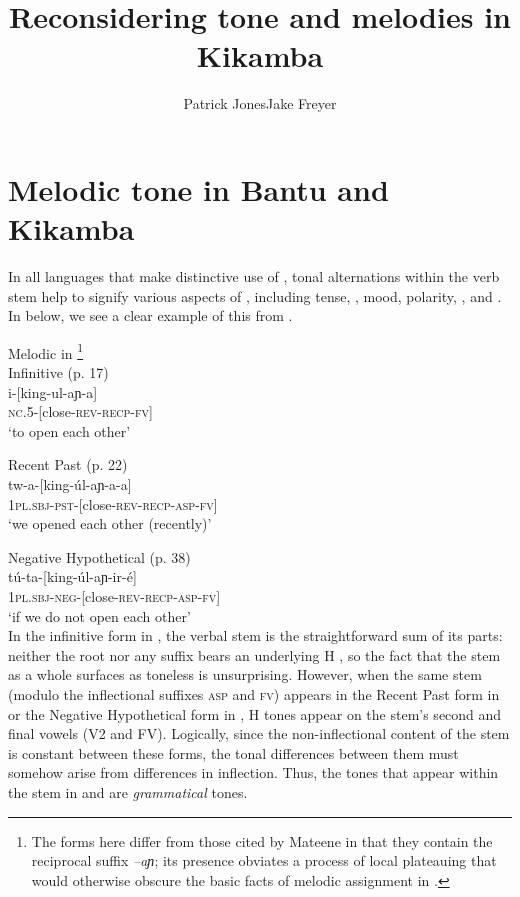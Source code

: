 \documentclass[output=paper,newtxmath,modfonts,nonflat,hidelinks]{langsci/langscibook}
\title{Reconsidering tone and melodies in Kikamba}
\author{Patrick Jones\affiliation{University of South Florida}\lastand Jake Freyer\affiliation{Brandeis University}}
\begin{document}
\maketitle

\section{Melodic tone in Bantu and Kikamba}\label{sec:jones:1}

In all  languages that make distinctive use of , tonal alternations within the verb stem help to signify various aspects of , including tense, , mood, polarity, , and  \citep{Bickmore2014}. In  below, we see a clear example of this from  \citep{Mateene1992}.


\ea\label{ex:jones:1}
Melodic  in  \citep{Mateene1992}\footnote{The forms here differ from those cited by Mateene in that they contain the reciprocal suffix \textit{–aɲ}; its presence obviates a process of local  plateauing that would otherwise obscure the basic facts of melodic  assignment in .}\\
\ea\label{ex:jones:1a}
Infinitive (p. 17)\\
\gll   i-[king-ul-aɲ-a]\\
       \textsc{nc}.5-[close-\textsc{rev}-\textsc{recp}-\textsc{fv}]\footnotemark\\
\glt   ‘to open each other’  


\ex\label{ex:jones:1b}
{Recent Past (p. 22)}\\
\gll   tw-a-[king-úl-aɲ-a-a]    \\
       \textsc{1pl.sbj}-\textsc{pst}-[close-\textsc{rev}-\textsc{recp}-\textsc{asp}-\textsc{fv}]\\
\glt ‘we opened each other (recently)’

\ex\label{ex:jones:1c}
{Negative Hypothetical (p. 38)}\\
\gll   tú-ta-[king-úl-aɲ-ir-é]\\
      \textsc{1pl.sbj-neg-[}close\textsc{-rev-recp-asp-fv]}\\
\glt ‘if we do not open each other’\\
\z
\z
In the infinitive form in , the verbal stem is the straightforward sum of its parts: neither the root nor any suffix bears an underlying H , so the fact that the stem as a whole surfaces as toneless is unsurprising. However, when the same stem (modulo the inflectional suffixes \textsc{asp} and \textsc{fv}) appears in the Recent Past form in  or the Negative Hypothetical form in , H tones appear on the stem’s second and final vowels (V2 and FV). Logically, since the non-inflectional content of the stem is constant between these forms, the tonal differences between them must somehow arise from differences in inflection. Thus, the tones that appear within the stem in  and  are \textit{grammatical} tones.
\end{document}
